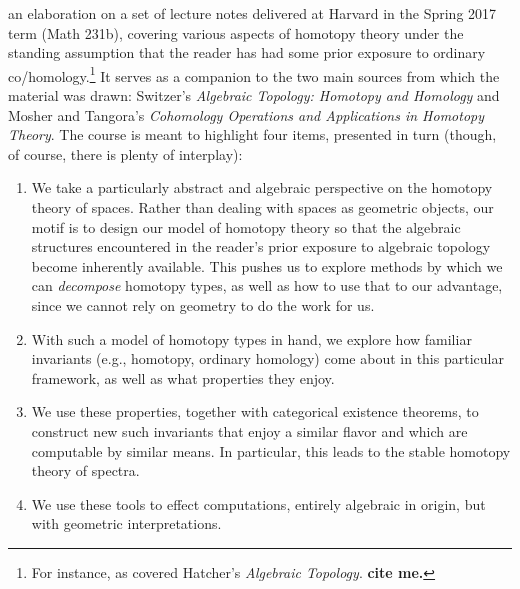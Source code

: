
\maketitle

 an elaboration on a set of lecture notes delivered at Harvard in the Spring 2017 term (Math 231b), covering various aspects of homotopy theory under the standing assumption that the reader has had some prior exposure to ordinary co/homology.\footnote{For instance, as covered Hatcher's \textit{Algebraic Topology}. \textbf{cite me.}}  It serves as a companion to the two main sources from which the material was drawn: Switzer's \textit{Algebraic Topology: Homotopy and Homology} and Mosher and Tangora's \textit{Cohomology Operations and Applications in Homotopy Theory}.  The course is meant to highlight four items, presented in turn (though, of course, there is plenty of interplay):

\begin{enumerate}
    \item We take a particularly abstract and algebraic perspective on the homotopy theory of spaces.  Rather than dealing with spaces as geometric objects, our motif is to design our model of homotopy theory so that the algebraic structures encountered in the reader's prior exposure to algebraic topology become inherently available.  This pushes us to explore methods by which we can \emph{decompose} homotopy types, as well as how to use that to our advantage, since we cannot rely on geometry to do the work for us.\label{DecompGoal}
    \item With such a model of homotopy types in hand, we explore how familiar invariants (e.g., homotopy, ordinary homology) come about in this particular framework, as well as what properties they enjoy.\label{InvariantsGoal}
    \item We use these properties, together with categorical existence theorems, to construct new such invariants that enjoy a similar flavor and which are computable by similar means.  In particular, this leads to the stable homotopy theory of spectra.\label{RepresentabilityGoal}
    \item We use these tools to effect computations, entirely algebraic in origin, but with geometric interpretations.\label{ComputationsGoal}
\end{enumerate}

